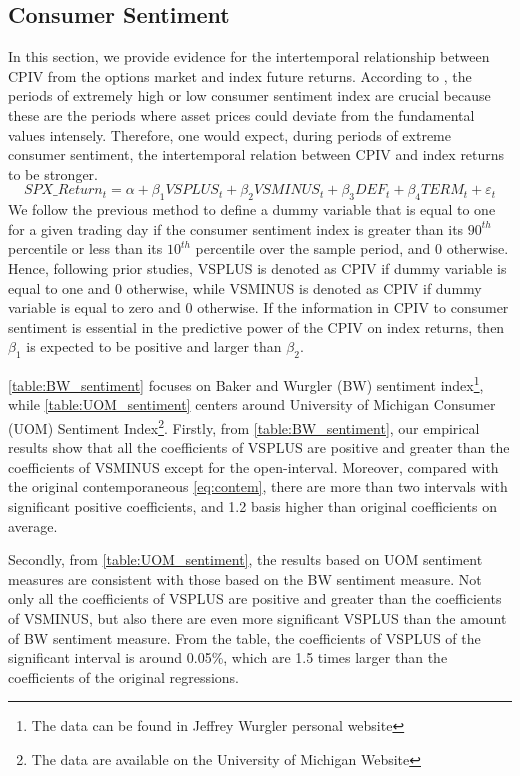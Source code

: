 
\subsection{Consumer Sentiment}
In this section, we provide evidence for the intertemporal relationship between CPIV from the options market and index future returns. 
According to \textcite{atilgan2015implied}, the periods of extremely high or low consumer sentiment index are crucial because these are the periods where asset prices could deviate from the fundamental values intensely. Therefore, one would expect, during periods of extreme consumer sentiment, the intertemporal relation between CPIV and index returns to be stronger.
 \begin{equation}  \label{eq:info}
SPX\_Return_{t} = \alpha + \beta _{1}VSPLUS_{t} + \beta _{2}VSMINUS_{t} + \beta _{3}DEF_{t} + \beta _{4}TERM_{t} + \varepsilon _{t}
 \end{equation}
We follow the previous method to define a dummy variable that is equal to one for a given trading day if the consumer sentiment index is greater than its $90^{th}$ percentile or less than its $10^{th}$ percentile over the sample period, and 0 otherwise. Hence, following prior studies, VSPLUS is denoted as CPIV if dummy variable is equal to one and 0 otherwise, while VSMINUS is denoted as CPIV if dummy variable is equal to zero and 0 otherwise. If the information in CPIV to consumer sentiment is essential in the predictive power of the CPIV on index returns, then $\beta _{1}$ is expected to be positive and larger than $\beta _{2}$. 

\autoref{table:BW_sentiment} focuses on Baker and Wurgler (BW) sentiment index\footnote{The data can be found in Jeffrey Wurgler personal website}, while \autoref{table:UOM_sentiment} centers around University of Michigan Consumer (UOM) Sentiment Index\footnote{The data are available on the University of Michigan Website}. Firstly, from \autoref{table:BW_sentiment}, our empirical results show that all the coefficients of VSPLUS are positive and greater than the coefficients of VSMINUS except for the open-interval. Moreover, compared with the original contemporaneous \autoref{eq:contem}, there are more than two intervals with significant positive coefficients, and 1.2 basis higher than original coefficients on average. 

Secondly, from \autoref{table:UOM_sentiment}, the results based on UOM sentiment measures are consistent with those based on the BW sentiment measure. Not only all the coefficients of VSPLUS are positive and greater than the coefficients of VSMINUS, but also there are even more significant VSPLUS than the amount of BW sentiment measure. From the table, the coefficients of VSPLUS of the significant interval is around 0.05\%, which are 1.5 times larger than the coefficients of the original regressions. 

